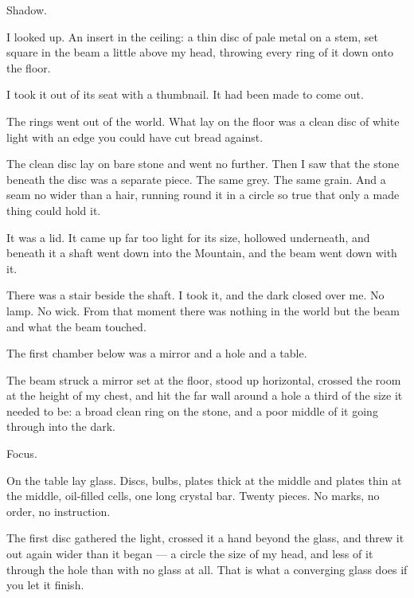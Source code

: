 Shadow.\par

I looked up. An insert in the ceiling: a thin disc of pale metal on a stem, set square in the beam a little above my head, throwing every ring of it down onto the floor.\par

I took it out of its seat with a thumbnail. It had been made to come out.\par

The rings went out of the world. What lay on the floor was a clean disc of white light with an edge you could have cut bread against.\par

\ornament

The clean disc lay on bare stone and went no further. Then I saw that the stone beneath the disc was a separate piece. The same grey. The same grain. And a seam no wider than a hair, running round it in a circle so true that only a made thing could hold it.\par

It was a lid. It came up far too light for its size, hollowed underneath, and beneath it a shaft went down into the Mountain, and the beam went down with it.\par

There was a stair beside the shaft. I took it, and the dark closed over me. No lamp. No wick. From that moment there was nothing in the world but the beam and what the beam touched.\par

\ornament

The first chamber below was a mirror and a hole and a table.\par

The beam struck a mirror set at the floor, stood up horizontal, crossed the room at the height of my chest, and hit the far wall around a hole a third of the size it needed to be: a broad clean ring on the stone, and a poor middle of it going through into the dark.\par

Focus.\par

On the table lay glass. Discs, bulbs, plates thick at the middle and plates thin at the middle, oil-filled cells, one long crystal bar. Twenty pieces. No marks, no order, no instruction.\par

The first disc gathered the light, crossed it a hand beyond the glass, and threw it out again wider than it began --- a circle the size of my head, and less of it through the hole than with no glass at all. That is what a converging glass does if you let it finish.\par

